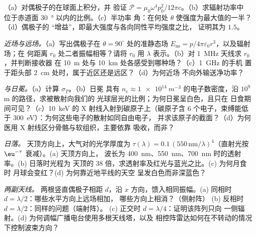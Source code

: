 \begin{exercise}[$\star\star$]\label{exo:b2:dipole-radiation:5}
（a）对偶极子的在球面上积分，并
验证 $\mathcal P = \mu_0\omega^4p_0^2/12\pi c$。（b）求辐射功率中
位于赤道面 \qty{30}{\degree} 以内的比例。（c）半功率
角：在何处 $\theta$ 使强度为最大值的一半？（d）偶极子的
“增益”，即最大强度与各向同性平均强度之比，
证明其为 $1.5$。
\end{exercise}

\begin{exercise}[$\star\star$]\label{exo:b2:dipole-radiation:6}
\emph{近场与远场。}（a）写出偶极子在
$\theta = 90^\circ$ 处的准静态场 $E_{\text{ns}} = p/4\pi\varepsilon_0r^3$，以及辐射场；在
何距离 $r_0$ 处二者振幅相等？请将 $r_0$ 用
$\lambda$ 表示。（b）对 \qty{1}{MHz} 天线求 $r_0$，并判断接收器
在 \qty{10}{m} 处与 \qty{10}{km} 处各感受到哪种场？（c）\qty{1}{GHz} 的手机
置于距头部 \qty{2}{cm} 处时，属于近区还是远区？（d）为何近场
不向外输送净功率？
\end{exercise}

\begin{exercise}[$\star\star$]\label{exo:b2:dipole-radiation:7}
\emph{与日冕。}（a）计算 $\sigma_T$。（b）日冕
具有 $n_e \approx \qty{1e14}{m^{-3}}$ 的电子数密度，沿 $10^9$ m 的路径，求被散射向我们的
光球层光的比例；为何日冕呈白色，且只在
日食期间可见？（c）\qty{10}{keV} 的 X 射线入射到碳原子上（碳原子含 $6$
个电子，束缚能低于 \qty{300}{eV}）：为何这些电子的散射如同自由电子，
并求该原子的截面？（d）为何
医用 X 射线区分骨骼与软组织，主要依靠
吸收，而非？
\end{exercise}

\begin{exercise}[$\star\star$]\label{exo:b2:dipole-radiation:8}
\emph{日落。} 天顶方向上，大气对的光学厚度为 $\tau(\lambda) = 0.1\,(550\,\text{nm}/\lambda)^4$（直射光按
$\eu^{-\tau}$ 衰减）。(a) 天顶方向上，
波长为 \qty{400}{nm}、\qty{550}{nm}、\qty{700}{nm} 时的透射率。(b) 日落时光程为
天顶的 $38$ 倍，求透射率及红光与蓝光之比。(c) 为何月食时
月球会变红？(d) 为何靠近地平线的天空
呈发白色而非深蓝色？
\end{exercise}

\begin{exercise}[$\star\star$]\label{exo:b2:dipole-radiation:9}
\emph{两副天线。} 两根竖直偶极子相距 $d$，沿
$x$ 方向，馈入相同振幅。(a) 同相时 $d = \lambda/2$：哪些水平方向上远场相加，
哪些方向上相消？（侧射阵）
(b) 反相时 $d = \lambda/2$：同样的问题（端射阵）。
(c) 正交时 $d = \lambda/4$：证明该阵列只向
一侧辐射。(d) 为何调幅广播电台使用多根天线塔，以及
相控阵雷达如何在不转动的情况下控制波束方向？
\end{exercise}

